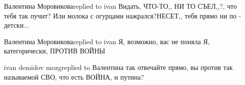  
 
 
 
 

Валентина Моровиковаreplied to ivan
Видать, ЧТО-ТО,, НИ ТО СЪЕЛ,,?, что тебя так пучит? Или молока с огурцами нажрался?НЕСЕТ,, тебя прямо ни по - детски... 🤣🤣🤣🤣

Валентина Моровиковаreplied to ivan
Я, возможно, вас не поняла
Я, категорически, ПРОТИВ ВОЙНЫ

ivan demidov mozgreplied to Валентина
так отвечайте прямо, вы против так называемой СВО, что есть ВОЙНА, и путина?
